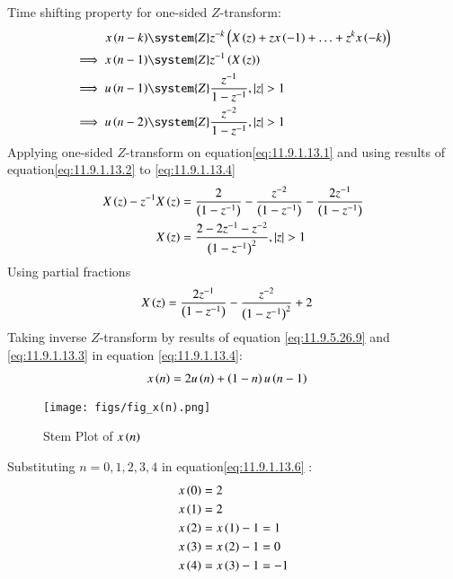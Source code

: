 \documentclass[journal,12pt,twocolumn]{IEEEtran}
\theoremstyle{remark}
\begin{document}
Time shifting property for one-sided $Z$-transform:
\begin{align}
x\brak{n-k}&\system{Z} z^{-k}\brak{X\brak{z}+zx\brak{-1} +\ldots + z^{k}x\brak{-k} }\label{eq:one-sided-shiftk}\\
\implies x\brak{n-1} &\system{Z} z^{-1}\brak{X\brak{z}}\label{eq:11.9.1.13.2}\\
\implies u\brak{n-1} &\system{Z} \frac{z^{-1}}{1-z^{-1}},\abs{z}>1 \label{eq:11.9.1.13.3}\\
\implies u\brak{n-2} &\system{Z} \frac{z^{-2}}{1-z^{-1}},\abs{z}>1 \label{eq:11.9.1.13.4}
\end{align}
Applying one-sided $Z$-transform on equation\eqref{eq:11.9.1.13.1} and using results of equation\eqref{eq:11.9.1.13.2} to \eqref{eq:11.9.1.13.4}
\begin{align}
X\left(z\right)- z^{-1}X\left(z\right) &= \frac{2}{\left(1-z^{-1}\right)} - \frac{z^{-2}}{\left(1-z^{-1}\right)}- \frac{2z^{-1}}{\left(1-z^{-1}\right)}\\
    X\left(z\right) &= \frac{2-2z^{-1}-z^{-2}}{\left(1-z^{-1}\right)^2}  ,   \left\vert z\right\vert >1
\end{align}
Using partial fractions
\begin{align}
    X\left(z\right) &= \frac{2z^{-1}}{\left(1-z^{-1}\right)} - \frac{z^{-2}}{\left(1-z^{-1}\right)^2} + 2\label{eq:11.9.1.13.5}
\end{align}
Taking inverse $Z$-transform by results of equation \eqref{eq:11.9.5.26.9} and \eqref{eq:11.9.1.13.3} in equation \eqref{eq:11.9.1.13.4}:
\begin{align}
    x\left(n\right) &= 2u\left(n\right)+\left(1-n\right)u\left(n-1\right)\label{eq:11.9.1.13.6}
\end{align}
\begin{figure}[H]
    \centering
    \texttt{[image: figs/fig\_x(n).png]}
    \caption{Stem Plot of $x\left(n\right)$}
    \label{fig:x(n)}
\end{figure}
Substituting $n=0,1,2,3,4$ in equation\eqref{eq:11.9.1.13.6} :
\begin{align}
    x\left(0\right) &= 2\\
    x\left(1\right) &= 2\\
    x\left(2\right) &= x\left(1\right) - 1 = 1  \\
    x\left(3\right) &= x\left(2\right) - 1 = 0\\
    x\left(4\right) &= x\left(3\right) - 1 = -1 
\end{align}
\end{document}
